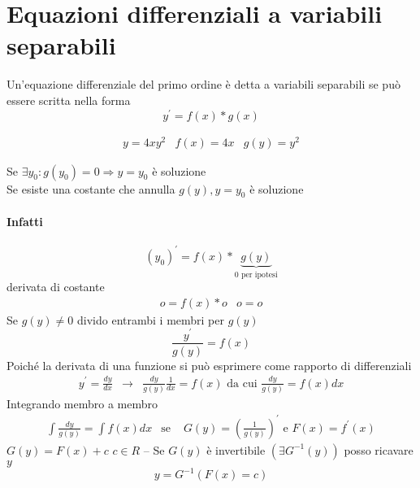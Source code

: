 \section{Equazioni differenziali a variabili separabili}
\begin{defi}
  Un'equazione differenziale del primo ordine è detta a variabili separabili se può
  essere scritta nella forma
  \begin{equation*}
    y^\prime =f(x)*g(x)
  \end{equation*}
\end{defi}
\begin{esempio}
  \begin{eqnarray*}
    y=4xy^2 & f(x)=4x & g(y)=y^2
  \end{eqnarray*}  
\end{esempio}
\begin{svol}
  Se $\exists y_0:g(y_0)=0\Rightarrow y=y_0$ è soluzione \\
  Se esiste una costante che annulla $g(y),y=y_0$ è soluzione
  \paragraph{Infatti}
  \begin{equation*}
    (y_0)^\prime=f(x)*\underbrace{g(y)}_{0 \text{ per ipotesi}}
  \end{equation*}
  derivata di costante
  \begin{eqnarray*}
    o=f(x)*o&o=o
  \end{eqnarray*}
  Se $g(y)\neq 0$ divido entrambi i membri per $g(y)$
  \begin{equation*}
    \frac{y^\prime}{g(y)}=f(x)
  \end{equation*}
  Poiché la derivata di una funzione si può esprimere come rapporto di differenziali
  \begin{eqnarray*}
    y^\prime=\frac{dy}{dx}&\to& \frac{dy}{g(y)}\frac{1}{dx}=f(x) \text{ da cui } \frac{dy}{g(y)}=f(x)dx
  \end{eqnarray*}
  Integrando membro a membro
  \begin{eqnarray*}
    \int \frac{dy}{g(y)}=\int f(x)dx & \text{se }& G(y)=\left(\frac{1}{g(y)}\right)^\prime \text{ e } F(x)=f^\prime (x)
  \end{eqnarray*}
  $G(y)=F(x)+c$ $c\in R$ -- Se $G(y)$ è invertibile $(\exists G^{-1}(y))$ posso ricavare
  $y$
  \begin{equation*}
    y=G^{-1}(F(x)=c)
  \end{equation*}
\end{svol}
